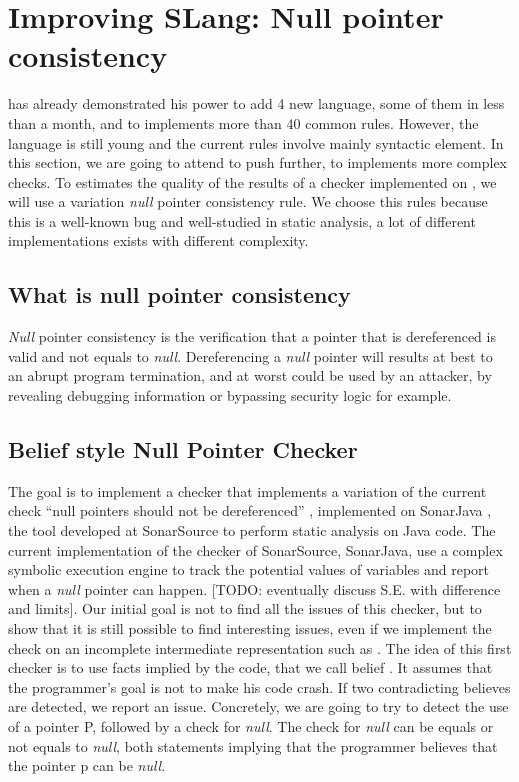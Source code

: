 \section{Improving SLang: Null pointer consistency}
\label{sec:improving_slang}

\slang{} has already demonstrated his power to add 4 new language, some of them in less than a month, and to implements more than 40 common rules. 
However, the language is still young and the current rules involve mainly syntactic element. 
In this section, we are going to attend to push \slang{} further, to implements more complex checks.
To estimates the quality of the results of a checker implemented on \slang{}, we will use a variation \emph{null} pointer consistency rule. 
We choose this rules because this is a well-known bug and well-studied in static analysis, a lot of different implementations exists with different complexity.

\subsection{What is null pointer consistency}
\label{subsec:null_pointer_consistency}

\emph{Null} pointer consistency is the verification that a pointer that is dereferenced is valid and not equals to \emph{null}. Dereferencing a \emph{null} pointer will results at best to an abrupt program termination, and at worst could be used by an attacker, by revealing debugging information or bypassing security logic for example.

\subsection{Belief style Null Pointer Checker}
\label{subsec:belief_style}

The goal is to implement a checker that implements a variation of the current check “null pointers should not be dereferenced” \cite{RSPEC-2259:2019:Online}, implemented on SonarJava \cite{SonarJava:2019:Online}, the tool developed at SonarSource to perform static analysis on Java code.
The current implementation of the checker of SonarSource, SonarJava, use a complex symbolic execution engine to track the potential values of variables and report when a \emph{null} pointer can happen.
[TODO: eventually discuss S.E. with difference and limits].
Our initial goal is not to find all the issues of this checker, but to show that it is still possible to find interesting issues, even if we implement the check on an incomplete intermediate representation such as \slang{}.
The idea of this first checker is to use facts implied by the code, that we call belief \cite{Engler:2001:BDB:502059.502041}.
It assumes that the programmer’s goal is not to make his code crash. If two contradicting believes are detected, we report an issue.
Concretely, we are going to try to detect the use of a pointer P, followed by a check for \emph{null}. The check for \emph{null} can be equals or not equals to \emph{null}, both statements implying that the programmer believes that the pointer p can be \emph{null}.

